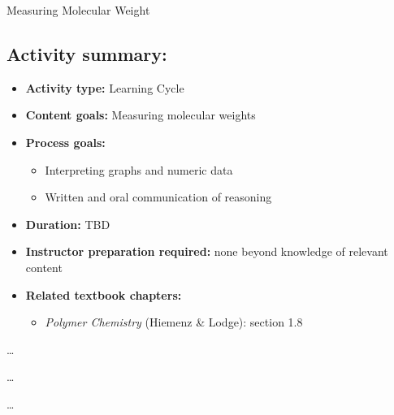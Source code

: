 \begin{activity}{Measuring Molecular Weight}
\begin{instructornotes}
	\subsection*{Activity summary:}
	\begin{itemize}
		\item \textbf{Activity type:} Learning Cycle
		\item \textbf{Content goals:} Measuring molecular weights
		\item \textbf{Process goals:} %
			\begin{itemize}
				\item Interpreting graphs and numeric data
				\item Written and oral communication of reasoning
			\end{itemize}
		\item \textbf{Duration:} TBD
		\item \textbf{Instructor preparation required:} none beyond knowledge of relevant content
		\item \textbf{Related textbook chapters:}
			\begin{itemize}
				\item \emph{Polymer Chemistry} (Hiemenz \& Lodge): section 1.8
			\end{itemize}
	\end{itemize}
	
\end{instructornotes}




\begin{model}
\label{\labelbase:mdl:endgrpanalysis}

	\dots

\end{model}


\begin{ctqs}

	\question \dots
	
\end{ctqs}

\begin{infobox}

	\dots


\end{infobox}
\end{activity}
